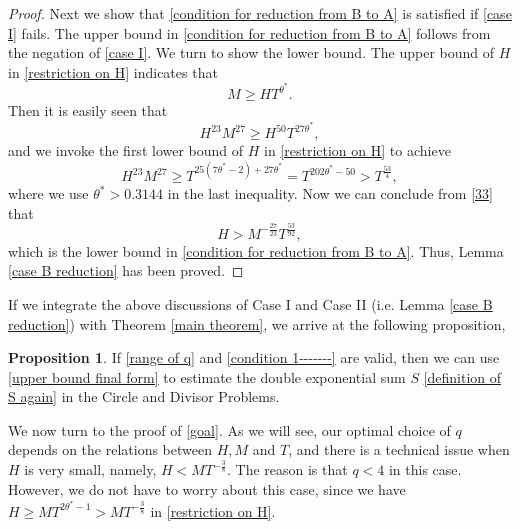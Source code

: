 \documentclass[11pt]{amsart}
\numberwithin{equation}{section}
\theoremstyle{definition}
\theoremstyle{proposition}
\newtheorem{proposition}{Proposition}[section]
\begin{document}
\begin{proof}
\quad 

Next we show that \eqref{condition for reduction from B to A} is satisfied if \eqref{case I} fails. The upper bound in \eqref{condition for reduction from B to A} follows from the negation of \eqref{case I}. We turn to show the lower bound. The upper bound of $H$ in \eqref{restriction on H} indicates that 
\[
M\ge HT^{\theta^*}.
\]
Then it is easily seen that 
\[
H^{23}M^{27}\ge H^{50}T^{27\theta^*},
\]
and we invoke the first lower bound of $H$ in \eqref{restriction on H} to achieve 
\begin{equation}  \label{33}
H^{23}M^{27}\ge T^{25(7\theta^*-2)+27\theta^*}= T^{202\theta^*-50}>T^{\frac{53}{4}},    
\end{equation}
where we use $\theta^*>0.3144$ in the last inequality. Now we can conclude from \eqref{33} that 
\[
H > M^{-\frac{27}{23}}T^{\frac{53}{92}},
\]
which is the lower bound in \eqref{condition for reduction from B to A}. Thus, Lemma \ref{case B reduction} has been proved. 
\end{proof}

If we integrate the above discussions of Case I and Case II (i.e. Lemma \ref{case B reduction}) with Theorem \ref{main theorem}, we arrive at the following proposition,
\begin{proposition}   \label{last proposition used}
If  \eqref{range of q} and \eqref{condition 1-------} are valid, then we can use \eqref{upper bound final form} to estimate the double exponential sum $S$ \eqref{definition of S again} in the Circle and Divisor Problems.    \\
\end{proposition}

We now turn to the proof of \eqref{goal}. As we will see, our optimal choice of $q$ depends on the relations between $H,M$ and $T$, and there is a technical issue when $H$ is very small, namely, $H< MT^{-\frac{3}{8}}$. The reason is that $q<4$ in this case. However, we do not have to worry about this case, since we have $H\ge MT^{2\theta^*-1}>MT^{-\frac{3}{8}}$ in \eqref{restriction on H}.  
\end{document}
